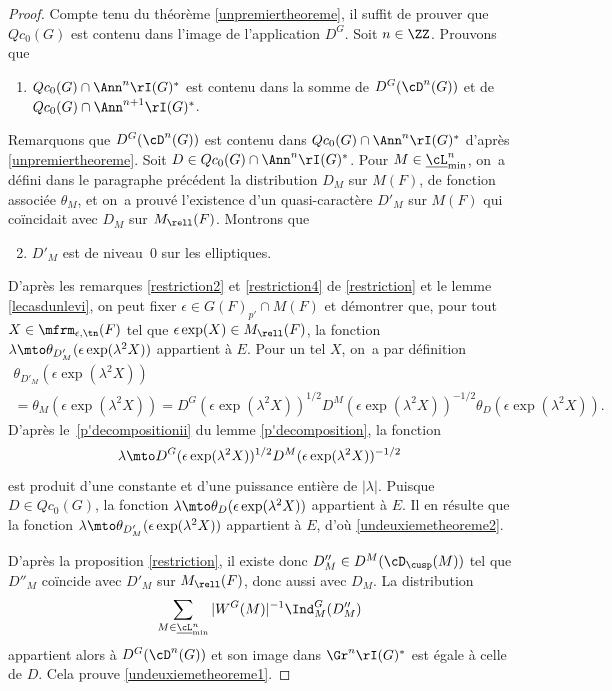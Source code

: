 \begin{proof}
Compte tenu du théorème \ref{unpremiertheoreme}, il suffit de prouver que $Qc_{0}(G)$ est contenu dans l'image de l'application $D^G$. Soit $n\in \ZZ$. Prouvons que
\begin{enumerate}
\item\label{undeuxiemetheoreme1}
$Qc_{0}(G)\cap \Ann^n\rI(G)^*$ est contenu dans la somme de $D^G(\cD^n(G))$ et de $Qc_{0}(G)\cap \Ann^{n+1}\rI(G)^*$.
\end{enumerate}

Remarquons que $D^G(\cD^n(G))$ est contenu dans $Qc_{0}(G)\cap \Ann^n\rI(G)^*$ d'après \ref{unpremiertheoreme}. Soit $D\in Qc_{0}(G)\cap \Ann^n\rI(G)^*$. Pour $M\in \underline{\cL}_{\min}^n$, on~a défini dans le paragraphe précédent la distribution $D_{M}$ sur $M(F)$, de fonction associée $\theta_{M}$, et on~a prouvé l'existence d'un quasi-caractère $D'_{M}$ sur $M(F)$ qui coïncidait avec $D_{M}$ sur $M_{\rell}(F)$. Montrons que
\begin{enumerate}\setcounter{enumi}{1}
\item\label{undeuxiemetheoreme2}
$D'_{M}$ est de niveau~$0$ sur les elliptiques.
\end{enumerate}

D'après les remarques \eqref{restriction2} et \eqref{restriction4} de \ref{restriction} et le lemme \ref{lecasdunlevi}, on peut fixer $\epsilon\in G(F)_{p'}\cap M(F)$ et démontrer que, pour tout $X\in \mfrm_{\epsilon,\tn}(F)$ tel que $\epsilon \exp(X)\in M_{\rell}(F)$, la fonction $\lambda\mto \theta_{D'_{M}}(\epsilon \exp(\lambda^2X))$ appartient à $E$. Pour un tel $X$, on~a par définition
\begin{multline*}
\theta_{D'_{M}}(\epsilon \exp(\lambda^2X))\\
=\theta_{M}(\epsilon \exp(\lambda^2X))=D^G(\epsilon \exp(\lambda^2X))^{1/2}D^M(\epsilon \exp(\lambda^2X))^{-1/2}\theta_{D}(\epsilon \exp(\lambda^2X)).
\end{multline*}
D'après le~\eqref{p'decompositionii} du lemme \ref{p'decomposition}, la fonction
\[
\lambda\mto D^G(\epsilon \exp(\lambda^2X))^{1/2}D^M(\epsilon \exp(\lambda^2X))^{-1/2}
\]
est produit d'une constante et d'une puissance entière de $\vert \lambda\vert $. Puisque $D\in Qc_{0}(G)$, la fonction $\lambda\mto \theta_{D}(\epsilon \exp(\lambda^2X))$ appartient à $E$. Il en résulte que la fonction $\lambda\mto \theta_{D'_{M}}(\epsilon \exp(\lambda^2X))$ appartient à $E$, d'où \eqref{undeuxiemetheoreme2}.

D'après la proposition \ref{restriction}, il existe donc $D''_{M}\in D^M(\cD_{\cusp}(M))$ tel que $D''_{M}$ coïncide avec $D'_{M}$ sur $M_{\rell}(F)$, donc aussi avec $D_{M}$. La distribution
\[
\sum_{M\in \underline{\cL}_{\min}^n} \vert W^G(M)\vert ^{-1}\Ind_{M}^G(D''_{M})
\]
appartient alors à $D^G(\cD^n(G))$ et son image dans $\Gr^n\rI(G)^*$ est égale à celle de $D$. Cela prouve \eqref{undeuxiemetheoreme1}.


\end{proof}
